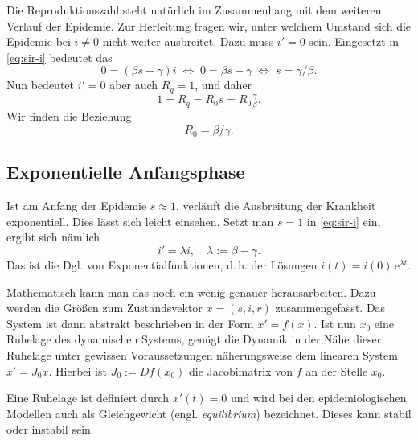 \documentclass[a4paper,10pt,fleqn,twocolumn,dvipdfmx]{scrartcl}
\numberwithin{equation}{section}
\newcommand{\ee}{\mathrm e}
\begin{document}
Die Reproduktionszahl steht natürlich im Zusammenhang mit dem weiteren
Verlauf der Epidemie. Zur Herleitung fragen wir, unter welchem Umstand
sich die Epidemie bei $i\ne 0$ nicht weiter ausbreitet. Dazu muss
$i'=0$ sein. Eingesetzt in \eqref{eq:sir-i} bedeutet das%
\begin{equation}
0 = (\beta s - \gamma) i \;\Leftrightarrow\; 0 = \beta s - \gamma
\;\Leftrightarrow\; s = \gamma/\beta.
\end{equation}
Nun bedeutet $i'=0$ aber auch $R_q=1$, und daher %
\begin{equation}
1 = R_q = R_0 s = R_0 \tfrac{\gamma}{\beta}.
\end{equation}
Wir finden die Beziehung
\begin{equation}
R_0 = \beta/\gamma.
\end{equation}

\subsection{Exponentielle Anfangsphase}

Ist am Anfang der Epidemie $s\approx 1$, verläuft die Ausbreitung
der Krankheit exponentiell. Dies lässt sich leicht einsehen. Setzt
man $s=1$ in \eqref{eq:sir-i} ein, ergibt sich nämlich%
\begin{equation}\label{eq:i-ode-exp}
i' = \lambda i,\quad \lambda := \beta-\gamma.
\end{equation}
Das ist die Dgl. von Exponentialfunktionen, d.\,h. der Lösungen
$i(t) = i(0)\,\ee^{\lambda t}$.

Mathematisch kann man das noch ein wenig genauer herausarbeiten.
Dazu werden die Größen zum Zustandsvektor $x=(s,i,r)$ zusammengefasst.
Das System ist dann abstrakt beschrieben in der Form $x'=f(x)$. Ist
nun $x_0$ eine Ruhelage des dynamischen Systems, genügt die Dynamik
in der Nähe dieser Ruhelage unter gewissen Voraussetzungen
näherungsweise dem linearen System $x' = J_0 x$. Hierbei ist
$J_0:=Df(x_0)$ die Jacobimatrix von $f$ an der Stelle $x_0$.

Eine Ruhelage ist definiert durch $x'(t)=0$ und wird bei den
epidemiologischen Modellen auch als Gleichgewicht (engl.
\emph{equilibrium}) bezeichnet. Dieses kann stabil oder instabil sein.
\end{document}
